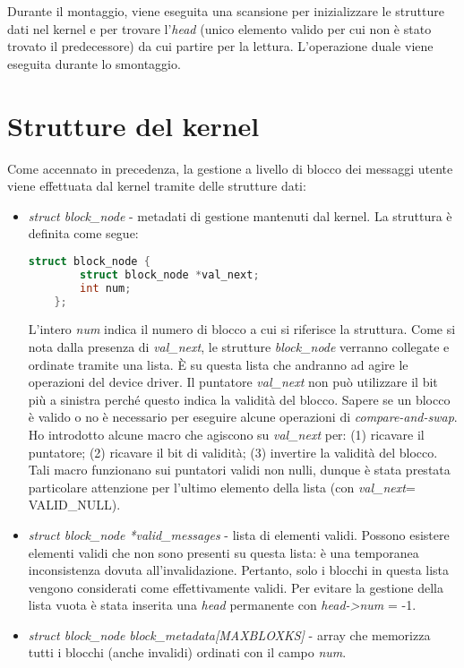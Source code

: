 \documentclass[a4paper,12pt,oneside]{book}
\begin{document}
\par Durante il montaggio, viene eseguita una scansione per inizializzare le strutture dati nel kernel e per trovare l'\emph{head} (unico elemento valido per cui non è stato trovato il predecessore) da cui partire per la lettura. L'operazione duale viene eseguita durante lo smontaggio.



	
	\section{Strutture del kernel}\label{sec:strutturekernel}
	Come accennato in precedenza, la gestione a livello di blocco dei messaggi utente viene effettuata dal kernel tramite delle strutture dati:

\begin{itemize}
		\item \emph{struct block\_node} - metadati di gestione mantenuti dal kernel. La struttura è definita come segue:
\begin{lstlisting}[language=C]
	struct block_node {
		struct block_node *val_next;
		int num; 	
	};
\end{lstlisting}
L'intero \emph{num} indica il numero di blocco a cui si riferisce la struttura. Come si nota dalla presenza di \emph{val\_next}, le strutture \emph{block\_node} verranno collegate e ordinate tramite una lista. È su questa lista che andranno ad agire le operazioni del device driver. Il puntatore \emph{val\_next} non può utilizzare il bit più a sinistra perché questo indica la validità del blocco. Sapere se un blocco è valido o no è necessario per eseguire alcune operazioni di \emph{compare-and-swap}.  Ho introdotto alcune macro che agiscono su \emph{val\_next} per: (1) ricavare il puntatore; (2) ricavare il bit di validità; (3) invertire la validità del blocco. Tali macro funzionano sui puntatori validi non nulli, dunque è stata prestata particolare attenzione per l'ultimo elemento della lista (con \emph{val\_next}= VALID\_NULL).

		\item \emph{struct block\_node *valid\_messages} - lista di elementi validi. Possono esistere elementi validi che non sono presenti su questa lista: è una temporanea inconsistenza dovuta all'invalidazione. Pertanto, solo i blocchi in questa lista vengono considerati come effettivamente validi. Per evitare la gestione della lista vuota è stata inserita una \emph{head} permanente con \emph{head->num} = -1.

		\item \emph{struct block\_node block\_metadata[MAXBLOXKS]} - array che memorizza tutti i blocchi (anche invalidi) ordinati con il campo \emph{num}.
\end{itemize}
\end{document}
